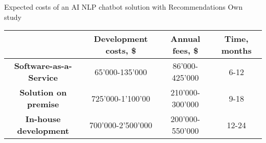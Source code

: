 \mttable
{Expected costs of an AI NLP chatbot solution with Recommendations}
{Own study}
{
    \begin{tabular}{| c | c | c | c |}
        \hline
        &
        \textbf{Development costs, \$} & 
        \textbf{Annual fees, \$} &
        \textbf{Time, months} \\ \hline 
       
        \textbf{Software-as-a-Service} & 
            65'000-135'000 & 
            86'000-425'000 &
            6-12 \\ \hline 
       
        \textbf{Solution on premise} & 
            725'000-1'100'00 &
            210'000-300'000 &
            9-18 \\ \hline 
            
        \textbf{In-house development} &
            700'000-2'500'000 &
            200'000-550'000 &
            12-24 \\ \hline
    \end{tabular}
}
